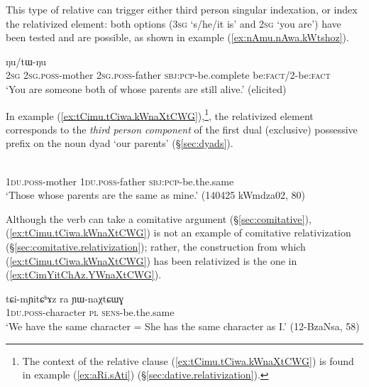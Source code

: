 This type of relative can trigger either third person singular indexation, or index the relativized element: both options (\textsc{3sg}  `s/he/it is' and \textsc{2sg}  `you are') have been tested and are possible, as shown in example (\ref{ex:nAmu.nAwa.kWtshoz}).

\begin{exe}
\ex \label{ex:nAmu.nAwa.kWtshoz}
 ŋu/tɯ-ŋu  \\  
\textsc{2sg} \textsc{2sg}.\textsc{poss}-mother  \textsc{2sg}.\textsc{poss}-father \textsc{sbj}:\textsc{pcp}-be.complete be:\textsc{fact}/2-be:\textsc{fact}  \\
\glt `You are someone both of whose parents are still alive.' (elicited)
\end{exe}

In example (\ref{ex:tCimu.tCiwa.kWnaXtCWG}),\footnote{The context of the relative clause (\ref{ex:tCimu.tCiwa.kWnaXtCWG}) is found in example (\ref{ex:aRi.sAti}) (§\ref{sec:dative.relativization}).}, the relativized element corresponds to the \textit{third person component} of the first dual (exclusive) possessive prefix  on the noun dyad  `our parents' (§\ref{sec:dyads}).
  

\begin{exe}
\ex \label{ex:tCimu.tCiwa.kWnaXtCWG}
 \\
\textsc{1du}.\textsc{poss}-mother  \textsc{1du}.\textsc{poss}-father \textsc{sbj}:\textsc{pcp}-be.the.same \\
\glt `Those whose parents are the same as mine.' (140425 kWmdza02, 80)
\end{exe}

Although the verb  can take a comitative argument (§\ref{sec:comitative}), (\ref{ex:tCimu.tCiwa.kWnaXtCWG}) is not an example of comitative relativization (§\ref{sec:comitative.relativization}); rather, the construction from which (\ref{ex:tCimu.tCiwa.kWnaXtCWG}) has been relativized is the one in (\ref{ex:tCimYitChAz.YWnaXtCWG}).

\begin{exe}
\ex \label{ex:tCimYitChAz.YWnaXtCWG}
\gll tɕi-mɲitɕʰɤz ra ɲɯ-naχtɕɯɣ \\
\textsc{1du}.\textsc{poss}-character \textsc{pl} \textsc{sens}-be.the.same \\
\glt `We have the same character = She has the same character as I.' (12-BzaNsa, 58)
\end{exe}

